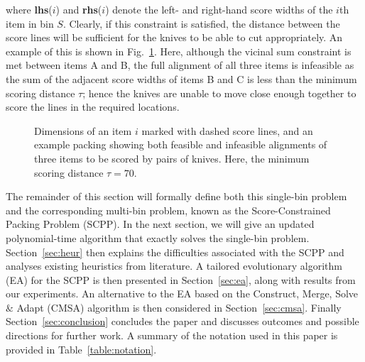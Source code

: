 \documentclass[a4paper,11pt,authoryear]{elsarticle}
\begin{document}
\noindent where \textbf{lhs}($i$) and \textbf{rhs}($i$) denote the left- and right-hand score widths of the $i$th item in bin $S$. Clearly, if this constraint is satisfied, the distance between the score lines will be sufficient for the knives to be able to cut appropriately. An example of this is shown in Fig.~\ref{fig:itemsdimknives}. Here, although the vicinal sum constraint is met between items A and B, the full alignment of all three items is infeasible as the sum of the adjacent score widths of items B and C is less than the minimum scoring distance $\tau$; hence the knives are unable to move close enough together to score the lines in the required locations.

\begin{figure}[H]	
	\centering
	
	\caption{Dimensions of an item $i$ marked with dashed score lines, and an example packing showing both feasible and infeasible alignments of three items to be scored by pairs of knives. Here, the minimum scoring distance $\tau = 70$.}	
	\label{fig:itemsdimknives}
\end{figure}

\noindent The remainder of this section will formally define both this single-bin problem and the corresponding multi-bin problem, known as the Score-Constrained Packing Problem (SCPP). In the next section, we will give an updated polynomial-time algorithm that exactly solves the single-bin problem. Section~\ref{sec:heur} then explains the difficulties associated with the SCPP and analyses existing heuristics from literature. A tailored evolutionary algorithm (EA) for the SCPP is then presented in Section~\ref{sec:ea}, along with results from our experiments. An alternative to the EA based on the Construct, Merge, Solve $\&$ Adapt (CMSA) algorithm is then considered in Section~\ref{sec:cmsa}. Finally Section~\ref{sec:conclusion} concludes the paper and discusses outcomes and possible directions for further work. A summary of the notation used in this paper is provided in Table~\ref{table:notation}.
\end{document}
